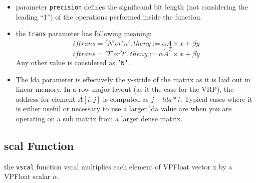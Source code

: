 \documentclass[11pt]{report}
\begin{document}
\begin{itemize}
\item parameter \texttt{precision} defines the significand bit length (not considering the leading ``1'') of the operations performed inside the function. 
\item the \texttt{trans} parameter has following meaning:
  \begin{equation}
    if trans= 'N' or 'n', then y := \alpha \dot A \times x + \beta \dot y
  \end{equation}
  \begin{equation}
  if trans= 'T' or 't', then y := \alpha \dot A^T \times x + \beta \dot y
\end{equation}
Any other value is considered as \texttt{'N'}.\\
\item The lda parameter is effectively the y-stride of the matrix as it is laid out in linear memory.
In a row-major layout (as it the case for the VRP), the address for element $A[i,j]$ is computed as $j+lda*i$. 
  Typical cases where it is either useful or necessary to use a larger lda value are when you are operating on a sub matrix from a larger dense matrix.
  \end{itemize}

\subsection{scal Function}
the \texttt{vscal} function vscal multiplies each element of  VPFloat vector x by a VPFloat scalar $\alpha$.
\end{document}
